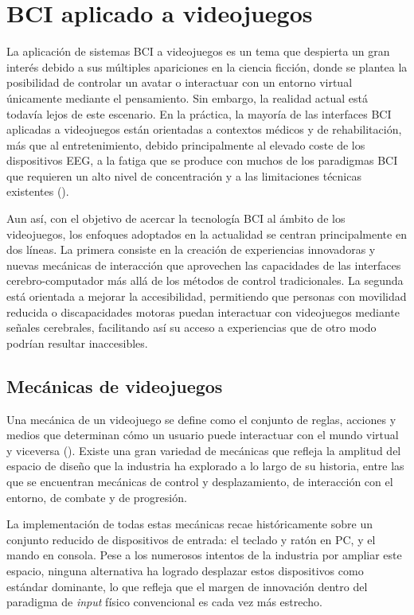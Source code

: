 \section{BCI aplicado a videojuegos}
\label{sec:trabajosRelacionados}

La aplicación de sistemas BCI a videojuegos es un tema que despierta un gran interés debido a sus múltiples apariciones en la ciencia ficción, donde se plantea la posibilidad de controlar un avatar o interactuar con un entorno virtual únicamente mediante el pensamiento. Sin embargo, la realidad actual está todavía lejos de este escenario. En la práctica, la mayoría de las interfaces BCI aplicadas a videojuegos están orientadas a contextos médicos y de rehabilitación, más que al entretenimiento, debido principalmente al elevado coste de los dispositivos EEG, a la fatiga que se produce con muchos de los paradigmas BCI que requieren un alto nivel de concentración y a las limitaciones técnicas existentes (\cite{kerous2018eeg}).

Aun así, con el objetivo de acercar la tecnología BCI al ámbito de los videojuegos, los enfoques adoptados en la actualidad se centran principalmente en dos líneas. La primera consiste en la creación de experiencias innovadoras y nuevas mecánicas de interacción que aprovechen las capacidades de las interfaces cerebro-computador más allá de los métodos de control tradicionales. La segunda está orientada a mejorar la accesibilidad, permitiendo que personas con movilidad reducida o discapacidades motoras puedan interactuar con videojuegos mediante señales cerebrales, facilitando así su acceso a experiencias que de otro modo podrían resultar inaccesibles.

\subsection{Mecánicas de videojuegos}
\label{subsec:MecanicasVideojuegos}

Una mecánica de un videojuego se define como el conjunto de reglas, acciones y medios que determinan cómo un usuario puede interactuar con el mundo virtual y viceversa (\cite{sicart2008defining}). Existe una gran variedad de mecánicas que refleja la amplitud del espacio de diseño que la industria ha explorado a lo largo de su historia, entre las que se encuentran mecánicas de control y desplazamiento, de interacción con el entorno, de combate y de progresión.

La implementación de todas estas mecánicas recae históricamente sobre un conjunto reducido de dispositivos de entrada: el teclado y ratón en PC, y el mando en consola. Pese a los numerosos intentos de la industria por ampliar este espacio, ninguna alternativa ha logrado desplazar estos dispositivos como estándar dominante, lo que refleja que el margen de innovación dentro del paradigma de \textit{input} físico convencional es cada vez más estrecho.

